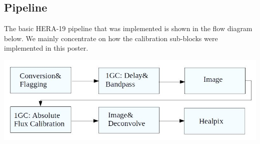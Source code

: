 \documentclass[a0,portrait]{a0poster}
\begin{document}
\begin{multicols}{2}



\color{DarkSlateGray} %
\section*{Pipeline}

The basic HERA-19 pipeline that was implemented is shown in the flow diagram below. We mainly concentrate on how the calibration sub-blocks were implemented in this poster.  

\begin{center}\vspace{1cm}
\includegraphics[width=0.8\linewidth]{pipeline.jpg}
\end{center}\vspace{1cm}


\end{multicols}
\end{document}
